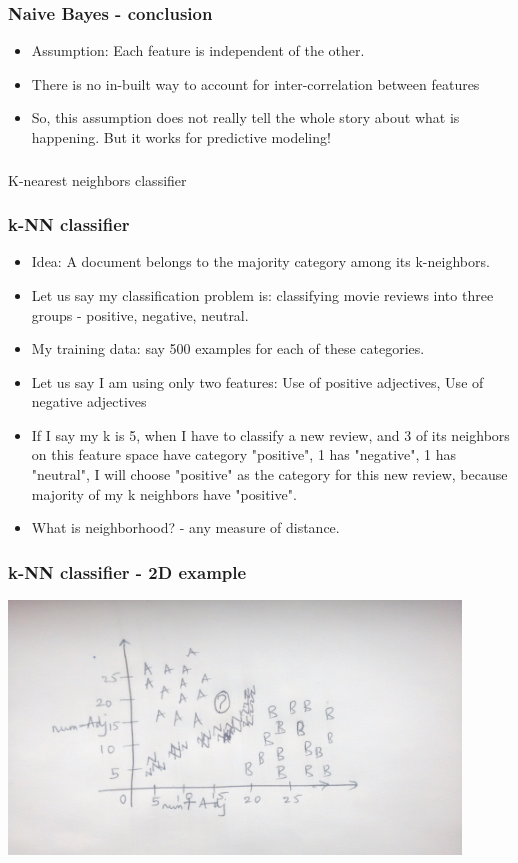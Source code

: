 \documentclass{beamer}
\begin{document}
\begin{frame}
\frametitle{Naive Bayes - conclusion}
\begin{itemize}
\item Assumption: Each feature is independent of the other.
\item There is no in-built way to account for inter-correlation between features
\item So, this assumption does not really tell the whole story about what is happening. But it works for predictive modeling! 
\end{itemize}
\end{frame}

\begin{frame}
\frametitle{}
\Large K-nearest  neighbors classifier
\end{frame}

\begin{frame}
\frametitle{k-NN classifier}
\begin{itemize}
\item Idea: A document belongs to the majority category among its k-neighbors. \pause
\item Let us say my classification problem is: classifying movie reviews into three groups - positive, negative, neutral.
\item My training data: say 500 examples for each of these categories.
\item Let us say I am using only two features: Use of positive adjectives, Use of negative adjectives 
\item If I say my k is 5, when I have to classify a new review, and 3 of its neighbors on this feature space have category "positive", 1 has "negative", 1 has "neutral", I will choose "positive" as the category for this new review, because majority of my k neighbors  have "positive".
\item What is neighborhood? - any measure of distance. 
\end{itemize}
\end{frame}

\begin{frame}
\frametitle{k-NN classifier - 2D example}
\includegraphics[width=0.9\textwidth]{KNN-Example.jpg}
\end{frame}
\end{document}
